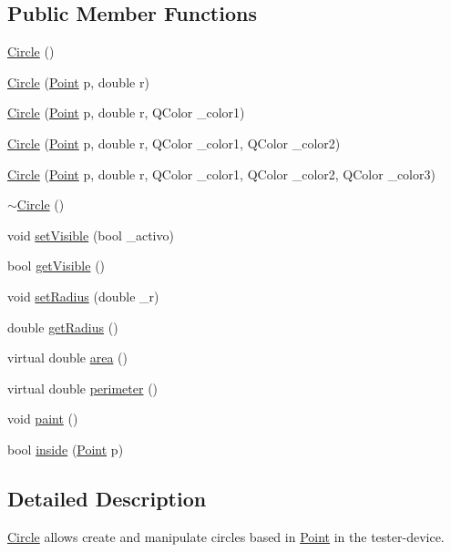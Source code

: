 \subsection*{Public Member Functions}
\begin{DoxyCompactItemize}
\item 
\hyperlink{class_circle_ad1ecfcfc7bf34529c6a6d6c448bf70fe}{Circle} ()
\item 
\hyperlink{class_circle_aba2dac9a187f9abd04524b318324bd37}{Circle} (\hyperlink{class_point}{Point} p, double r)
\item 
\hyperlink{class_circle_a93a575926e1f7e7ded601a62c6530077}{Circle} (\hyperlink{class_point}{Point} p, double r, QColor \_\-color1)
\item 
\hyperlink{class_circle_a04f586b7f7943ea11652f858f6ffac3c}{Circle} (\hyperlink{class_point}{Point} p, double r, QColor \_\-color1, QColor \_\-color2)
\item 
\hyperlink{class_circle_a7a3f85aba3ba8228f2b3336a034f865f}{Circle} (\hyperlink{class_point}{Point} p, double r, QColor \_\-color1, QColor \_\-color2, QColor \_\-color3)
\item 
\hyperlink{class_circle_ae3f30436e645d73e368e8ee55f8d1650}{$\sim$Circle} ()
\item 
void \hyperlink{class_circle_ac900b9ff88e37e38363b430f0206bfad}{setVisible} (bool \_\-activo)
\item 
bool \hyperlink{class_circle_a4ff23e38b81fc22fa89f4e2155f759bc}{getVisible} ()
\item 
void \hyperlink{class_circle_a327bedfc4ded6c65ae63aa7258307a73}{setRadius} (double \_\-r)
\item 
double \hyperlink{class_circle_af9fccec77d3a15d63594666dc8501437}{getRadius} ()
\item 
virtual double \hyperlink{class_circle_a4f31d14f360b6e1f1acfb283ad65145a}{area} ()
\item 
virtual double \hyperlink{class_circle_ab0a4db4a814591918b0372feac5df46b}{perimeter} ()
\item 
void \hyperlink{class_circle_a907d31f610a206b32ec8e930f0355222}{paint} ()
\item 
bool \hyperlink{class_circle_ab70abceb992ef43842534160449a2964}{inside} (\hyperlink{class_point}{Point} p)
\end{DoxyCompactItemize}


\subsection{Detailed Description}
\hyperlink{class_circle}{Circle} allows create and manipulate circles based in \hyperlink{class_point}{Point} in the tester-\/device. 

